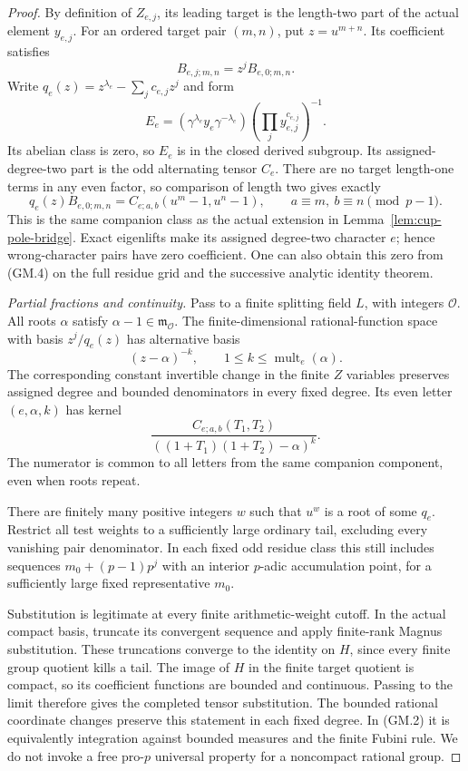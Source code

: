 \documentclass[11pt,a4paper]{article}
\theoremstyle{definition}
\begin{document}
\begin{proof}
By definition of $Z_{e,j}$, its leading target is the length-two
part of the actual element $y_{e,j}$. For an ordered target pair
$(m,n)$, put $z=u^{m+n}$. Its coefficient satisfies
\[
 B_{e,j;m,n}=z^jB_{e,0;m,n}.
\]
Write $q_e(z)=z^{\lambda_e}-\sum_jc_{e,j}z^j$ and form
\[
 E_e=(\gamma^{\lambda_e}y_e\gamma^{-\lambda_e})
       \left(\prod_jy_{e,j}^{c_{e,j}}\right)^{-1}.
\]
Its abelian class is zero, so $E_e$ is in the closed derived
subgroup. Its assigned-degree-two part is the odd alternating
tensor $C_e$. There are no target length-one terms in any even
factor, so comparison of length two gives exactly
\[
 q_e(z)B_{e,0;m,n}
   =C_{e;a,b}(u^m-1,u^n-1),\qquad
 a\equiv m,\ b\equiv n\pmod{p-1}.                           \tag{GM.4}
\]
This is the same companion class as the actual extension in
Lemma~\ref{lem:cup-pole-bridge}. Exact eigenlifts make its assigned
degree-two character $e$; hence wrong-character pairs have zero
coefficient. One can also obtain this zero from (GM.4) on the full
residue grid and the successive analytic identity theorem.

\emph{Partial fractions and continuity.}
Pass to a finite splitting field $L$, with integers $\mathcal O$.
All roots $\alpha$ satisfy $\alpha-1\in\mathfrak m_{\mathcal O}$.
The finite-dimensional rational-function space with basis
$z^j/q_e(z)$ has alternative basis
\[
 (z-\alpha)^{-k},\qquad
 1\le k\le\operatorname{mult}_e(\alpha).
\]
The corresponding constant invertible change in the finite $Z$
variables preserves assigned degree and bounded denominators in
every fixed degree. Its even letter $(e,\alpha,k)$ has kernel
\[
 \frac{C_{e;a,b}(T_1,T_2)}
      {((1+T_1)(1+T_2)-\alpha)^k}.                          \tag{GM.5}
\]
The numerator is common to all letters from the same companion
component, even when roots repeat.

There are finitely many positive integers $w$ such that $u^w$ is a
root of some $q_e$. Restrict all test weights to a sufficiently
large ordinary tail, excluding every vanishing pair denominator.
In each fixed odd residue class this still includes sequences
$m_0+(p-1)p^j$ with an interior $p$-adic accumulation point, for
a sufficiently large fixed representative $m_0$.

Substitution is legitimate at every finite arithmetic-weight cutoff.
In the actual compact basis, truncate its convergent sequence and
apply finite-rank Magnus substitution. These truncations converge
to the identity on $H$, since every finite group quotient kills a
tail. The image of $H$ in the finite target quotient is compact,
so its coefficient functions are bounded and continuous. Passing
to the limit therefore gives the completed tensor substitution.
The bounded rational coordinate changes preserve this statement in
each fixed degree. In (GM.2) it is equivalently integration against
bounded measures and the finite Fubini rule. We do not invoke a
free pro-$p$ universal property for a noncompact rational group.


\end{proof}
\end{document}
